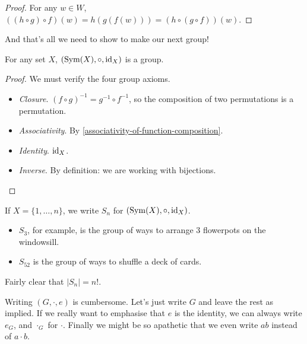 \documentclass{../template/note}
\begin{document}
    \begin{proof}
        For any \(w \in W\), \(((h \circ g) \circ f)(w) = h(g(f(w))) = (h \circ (g \circ f))(w)\).
    \end{proof}
    
    And that's all we need to show to make our next group!

    \begin{proposition}
        For any set \(X\), \((\operatorname{Sym}(X), \circ, \operatorname{id}_X)\) is a group.
    \end{proposition}
    
    \begin{proof}
        We must verify the four group axioms.
        \begin{itemize}
            \item \emph{Closure}. \((f \circ g)^{-1} = g^{-1} \circ f^{-1}\), so the composition of two permutations is a permutation.
            \item \emph{Associativity}. By \cref{associativity-of-function-composition}.
            \item \emph{Identity}. \(\operatorname{id}_X\).
            \item \emph{Inverse}. By definition: we are working with bijections.
        \end{itemize}
        
        
    \end{proof}
    
    \begin{definition}
        If \(X = \{1, \dots, n\}\), we write \(S_n\) for \((\operatorname{Sym}(X), \circ, \operatorname{id}_X)\).
    \end{definition}
    
    \begin{example*}
        \begin{itemize}
            \item \(S_3\), for example, is the group of ways to arrange 3 flowerpots on the windowsill.
            \item \(S_{52}\) is the group of ways to shuffle a deck of cards.
        \end{itemize}
    \end{example*}
    
    \noindent Fairly clear that \(|S_n| = n!\).

    \begin{remark*}[Notation]
        Writing \((G, \cdot, e)\) is cumbersome. Let's just write \(G\) and leave the rest as implied. If we really want to emphasise that \(e\) is the identity, we can always write \(e_G\), and \(\cdot_G\) for \(\cdot\). Finally we might be so apathetic that we even write \(ab\) instead of \(a \cdot b\).
    \end{remark*}
    
\end{document}
